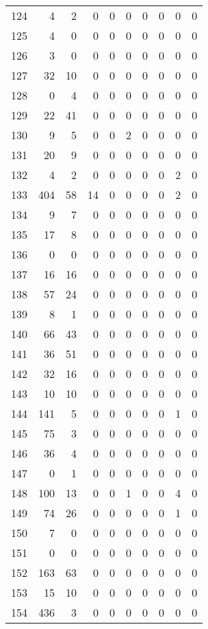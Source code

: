 \begin{tabular}{lrrrrrrrrr}
124 & 4 & 2 & 0 & 0 & 0 & 0 & 0 & 0 & 0 \\
125 & 4 & 0 & 0 & 0 & 0 & 0 & 0 & 0 & 0 \\
126 & 3 & 0 & 0 & 0 & 0 & 0 & 0 & 0 & 0 \\
127 & 32 & 10 & 0 & 0 & 0 & 0 & 0 & 0 & 0 \\
128 & 0 & 4 & 0 & 0 & 0 & 0 & 0 & 0 & 0 \\
129 & 22 & 41 & 0 & 0 & 0 & 0 & 0 & 0 & 0 \\
130 & 9 & 5 & 0 & 0 & 2 & 0 & 0 & 0 & 0 \\
131 & 20 & 9 & 0 & 0 & 0 & 0 & 0 & 0 & 0 \\
132 & 4 & 2 & 0 & 0 & 0 & 0 & 0 & 2 & 0 \\
133 & 404 & 58 & 14 & 0 & 0 & 0 & 0 & 2 & 0 \\
134 & 9 & 7 & 0 & 0 & 0 & 0 & 0 & 0 & 0 \\
135 & 17 & 8 & 0 & 0 & 0 & 0 & 0 & 0 & 0 \\
136 & 0 & 0 & 0 & 0 & 0 & 0 & 0 & 0 & 0 \\
137 & 16 & 16 & 0 & 0 & 0 & 0 & 0 & 0 & 0 \\
138 & 57 & 24 & 0 & 0 & 0 & 0 & 0 & 0 & 0 \\
139 & 8 & 1 & 0 & 0 & 0 & 0 & 0 & 0 & 0 \\
140 & 66 & 43 & 0 & 0 & 0 & 0 & 0 & 0 & 0 \\
141 & 36 & 51 & 0 & 0 & 0 & 0 & 0 & 0 & 0 \\
142 & 32 & 16 & 0 & 0 & 0 & 0 & 0 & 0 & 0 \\
143 & 10 & 10 & 0 & 0 & 0 & 0 & 0 & 0 & 0 \\
144 & 141 & 5 & 0 & 0 & 0 & 0 & 0 & 1 & 0 \\
145 & 75 & 3 & 0 & 0 & 0 & 0 & 0 & 0 & 0 \\
146 & 36 & 4 & 0 & 0 & 0 & 0 & 0 & 0 & 0 \\
147 & 0 & 1 & 0 & 0 & 0 & 0 & 0 & 0 & 0 \\
148 & 100 & 13 & 0 & 0 & 1 & 0 & 0 & 4 & 0 \\
149 & 74 & 26 & 0 & 0 & 0 & 0 & 0 & 1 & 0 \\
150 & 7 & 0 & 0 & 0 & 0 & 0 & 0 & 0 & 0 \\
151 & 0 & 0 & 0 & 0 & 0 & 0 & 0 & 0 & 0 \\
152 & 163 & 63 & 0 & 0 & 0 & 0 & 0 & 0 & 0 \\
153 & 15 & 10 & 0 & 0 & 0 & 0 & 0 & 0 & 0 \\
154 & 436 & 3 & 0 & 0 & 0 & 0 & 0 & 0 & 0 \\

\end{tabular}
